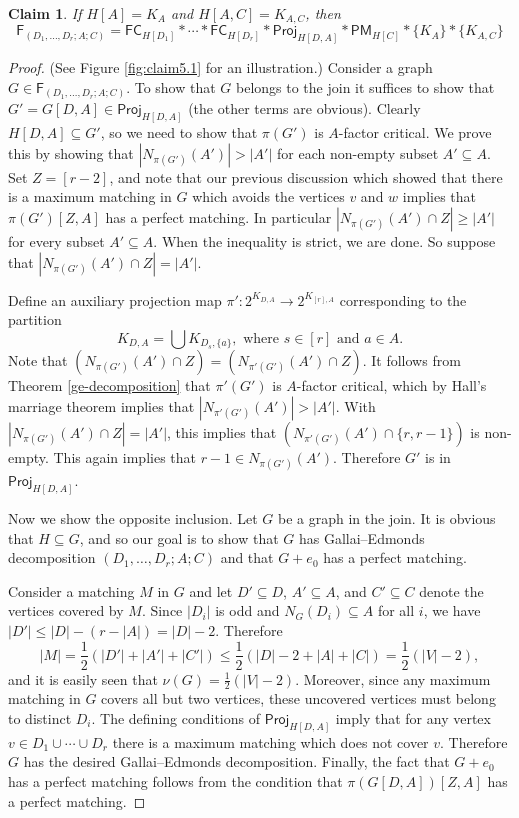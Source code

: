 \documentclass[10pt]{amsart}
\newtheorem{claim}[thm]{Claim}
\theoremstyle{definition}
\begin{document}
	\begin{claim}\label{perfect matching join}
		If $H[A] = K_A$ and $H[A,C] = K_{A,C}$, then 
		\[\mathsf{F}_{(D_1, \dots, D_r; A; C)} = \mathsf{FC}_{H[D_1]} * \cdots * \mathsf{FC}_{H[D_r]} * \mathsf{Proj}_{H[D,A]} * \mathsf{PM}_{H[C]} * \{K_A\} * \{K_{A,C}\}\]
	\end{claim}
	\begin{proof}
		(See Figure \ref{fig:claim5.1} for an illustration.) Consider a graph $G\in \mathsf{F}_{(D_1, \dots, D_r; A; C)}$. 
		To show that $G$ belongs to the join it suffices to show that $G' = G[D,A]\in \mathsf{Proj}_{H[D,A]}$ (the other terms are obvious). 
		Clearly $H[D,A]\subseteq G'$, 
		so we need to show that $\pi(G')$ is $A$-factor critical. We prove this by showing that $|N_{\pi(G')}(A')|>|A'|$ for each non-empty subset $A'\subseteq A$. Set $Z = [r-2]$, and
		note that our previous discussion which showed that there is a maximum matching in $G$ which avoids the vertices $v$ and $w$ implies that $\pi(G')[Z,A]$ has a perfect matching. In particular $|N_{\pi(G')}(A')\cap Z| \geq |A'|$ for every subset $A'\subseteq A$. When the inequality is strict, we are done. So suppose that $|N_{\pi(G')}(A')\cap Z| = |A'|$.
		
		Define an auxiliary projection map $\pi' : 2^{K_{D,A}} \to 2^{K_{[r], A}}$ corresponding to the partition
		\[K_{D,A} = \textstyle{\bigcup} K_{D_s, \{a\}}, \text{ where } s\in [r] \text{ and }a\in A.\]
		Note that $(N_{\pi(G')}(A') \cap Z) = (N_{\pi'(G')}(A') \cap Z)$. 
		It follows from Theorem \ref{ge-decomposition} that $\pi'(G')$ is $A$-factor critical, which by Hall's marriage theorem implies that $|N_{\pi'(G')}(A')|>|A'|$. With $|N_{\pi(G')}(A')\cap Z| = |A'|$, this implies that $(N_{\pi'(G')}(A')\cap \{r, r-1\})$ is non-empty. This again implies that $r-1 \in N_{\pi(G')}(A')$. Therefore $G'$ is in $\mathsf{Proj}_{H[D,A]}$. 
		
		
		Now we show the opposite inclusion.
		Let $G$ be a graph in the join. It is obvious that $H\subseteq G$, and so our goal is to show that $G$ has Gallai--Edmonds decomposition $(D_1, \dots, D_r; A; C)$ and that $G+e_0$ has a perfect matching. 
		
		Consider a matching $M$ in $G$ and let $D'\subseteq D$, $A'\subseteq A$, and $C'\subseteq C$ denote the vertices covered by $M$. Since $|D_i|$ is odd and $N_G(D_i) \subseteq A$ for all $i$, we have $|D'|\leq |D| - (r - |A|) = |D|-2$. Therefore 
		\[|M| = \textstyle{\frac{1}{2}}(|D'|+|A'|+|C'|) \leq \textstyle{\frac{1}{2}}(|D|-2+|A|+|C|) = \textstyle{\frac{1}{2}}(|V|-2),\]
		and it is easily seen that $\nu(G)= \frac{1}{2}(|V|-2)$. Moreover, since any maximum matching in $G$ covers all but two vertices, these uncovered vertices must belong to distinct $D_i$. The defining conditions of $\mathsf{Proj}_{H[D,A]}$ imply that for any vertex $v\in D_1\cup \cdots \cup D_r$ there is a maximum matching which does not cover $v$. Therefore $G$ has the desired Gallai--Edmonds decomposition. 
		Finally, the fact that $G+e_0$ has a perfect matching follows from the condition that $\pi(G[D,A])[Z,A]$ has a perfect matching. 
	\end{proof}
	
\end{document}

